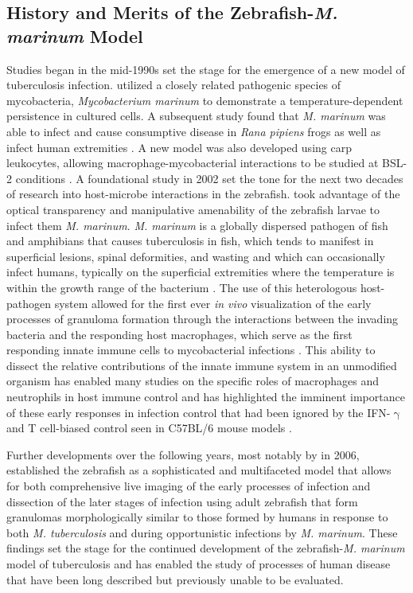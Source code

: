 \subsection{History and Merits of the Zebrafish-\textit{M. marinum} Model}\label{zfmmhis}

Studies began in the mid-1990s set the stage for the emergence of a new model of tuberculosis infection. \citeauthor{Ramakrishnan1994} utilized a closely related pathogenic species of mycobacteria, \textit{Mycobacterium marinum} to demonstrate a temperature-dependent persistence in cultured cells. A subsequent study found that \textit{M. marinum} was able to infect and cause consumptive disease in \textit{Rana pipiens} frogs as well as infect human extremities \citep{Ramakrishnan1997, Ramakrishnan1997, Cosma2006}. A new model was also developed using carp leukocytes, allowing macrophage-mycobacterial interactions to be studied at BSL-2 conditions \citep{ElEtr2001}. A foundational study in 2002 set the tone for the next two decades of research into host-microbe interactions in the zebrafish. \citeauthor{Davis2002} took advantage of the optical transparency and manipulative amenability of the zebrafish larvae to infect them \textit{M. marinum}. \textit{M. marinum} is a globally dispersed pathogen of fish and amphibians that causes tuberculosis in fish, which tends to manifest in superficial lesions, spinal deformities, and wasting and which can occasionally infect humans, typically on the superficial extremities where the temperature is within the growth range of the bacterium \citep{Hashish2018, Aronson1926, Gray1990, Parisot1958}. The use of this heterologous host-pathogen system allowed for the first ever \textit{in vivo} visualization of the early processes of granuloma formation through the interactions between the invading bacteria and the responding host macrophages, which serve as the first responding innate immune cells to mycobacterial infections \citep{Davis2002, Davis2009}. This ability to dissect the relative contributions of the innate immune system in an unmodified organism has enabled many studies on the specific roles of macrophages and neutrophils in host immune control and has highlighted the imminent importance of these early responses in infection control that had been ignored by the IFN-$\upgamma$ and T cell-biased control seen in C57BL/6 mouse models \citep{Lesley2008}.

Further developments over the following years, most notably by \citeauthor{Swaim2006} in 2006, established the zebrafish as a sophisticated and multifaceted model that allows for both comprehensive live imaging of the early processes of infection and dissection of the later stages of infection using adult zebrafish that form granulomas morphologically similar to those formed by humans in response to both \textit{M. tuberculosis} and during opportunistic infections by \textit{M. marinum}. These findings set the stage for the continued development of the zebrafish-\textit{M. marinum} model of tuberculosis and has enabled the study of processes of human disease that have been long described but previously unable to be evaluated.

